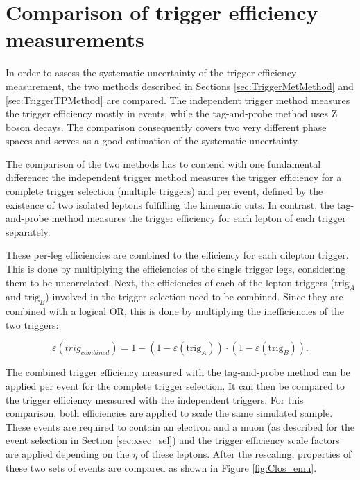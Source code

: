 

\section{Comparison of trigger efficiency measurements}
\label{sec:TriggerComp}

In order to assess the systematic uncertainty of the trigger efficiency measurement, the two methods described in Sections \ref{sec:TriggerMetMethod} and \ref{sec:TriggerTPMethod} are compared.
The independent trigger method measures the trigger efficiency mostly in \ttbar events, while the tag-and-probe method uses Z boson decays. The comparison consequently covers two 
very different phase spaces and serves as a good estimation of the systematic uncertainty.

The comparison of the two methods has to contend with one fundamental difference: the independent trigger method measures the trigger efficiency for a complete trigger selection (multiple triggers) and per event, defined by the existence of two isolated leptons fulfilling the kinematic cuts. In contrast, the tag-and-probe method measures the trigger efficiency for each lepton of each trigger separately. 

These per-leg efficiencies are combined to the efficiency for each dilepton trigger. This is done by multiplying the efficiencies of the single trigger legs, considering them to be uncorrelated. 
Next, the efficiencies of each of the lepton triggers ($\mathrm{trig}_A$ and $\mathrm{trig}_B$) involved in the trigger selection need to be combined. Since they are combined with a logical OR, this is done by multiplying the inefficiencies of the two triggers:

\begin{equation}
\varepsilon(trig_{combined}) = 1- (1-\varepsilon(\mathrm{trig}_A))\cdot(1- \varepsilon(\mathrm{trig}_B)).
\label{eq:TPcombine}
\end{equation}

The combined trigger efficiency measured with the tag-and-probe method can be applied per event for the complete trigger selection. It can then be compared to the trigger efficiency measured with the independent triggers.
For this comparison, both efficiencies are applied to scale the same simulated \ttbar sample. These \ttbar events are required to contain an electron and a muon (as described for the event selection in Section \ref{sec:xsec_sel}) and the trigger efficiency scale factors are applied depending on the $\eta$ of these leptons.
After the rescaling, properties of these two sets of \ttbar events are compared as shown in Figure \ref{fig:Clos_emu}.

